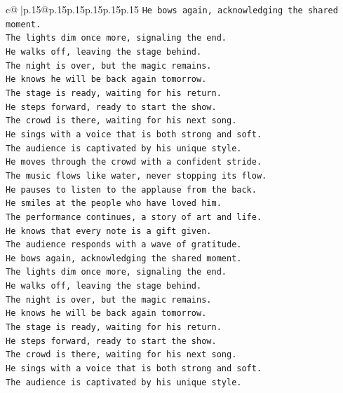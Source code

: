 \documentclass{article}
\begin{document}
{\begin{supertabular}{c@{$\;$}|p{.15\linewidth}@{}p{.15\linewidth}p{.15\linewidth}p{.15\linewidth}p{.15\linewidth}p{.15\linewidth}}
{{{\texttt{He bows again, acknowledging the shared moment.} \\
\texttt{The lights dim once more, signaling the end.} \\
\texttt{He walks off, leaving the stage behind.} \\
\texttt{The night is over, but the magic remains.} \\
\texttt{He knows he will be back again tomorrow.} \\
\texttt{The stage is ready, waiting for his return.} \\
\texttt{He steps forward, ready to start the show.} \\
\texttt{The crowd is there, waiting for his next song.} \\
\texttt{He sings with a voice that is both strong and soft.} \\
\texttt{The audience is captivated by his unique style.} \\
\texttt{He moves through the crowd with a confident stride.} \\
\texttt{The music flows like water, never stopping its flow.} \\
\texttt{He pauses to listen to the applause from the back.} \\
\texttt{He smiles at the people who have loved him.} \\
\texttt{The performance continues, a story of art and life.} \\
\texttt{He knows that every note is a gift given.} \\
\texttt{The audience responds with a wave of gratitude.} \\
\texttt{He bows again, acknowledging the shared moment.} \\
\texttt{The lights dim once more, signaling the end.} \\
\texttt{He walks off, leaving the stage behind.} \\
\texttt{The night is over, but the magic remains.} \\
\texttt{He knows he will be back again tomorrow.} \\
\texttt{The stage is ready, waiting for his return.} \\
\texttt{He steps forward, ready to start the show.} \\
\texttt{The crowd is there, waiting for his next song.} \\
\texttt{He sings with a voice that is both strong and soft.} \\
\texttt{The audience is captivated by his unique style.} \\
}}}
\end{supertabular}}
\end{document}
